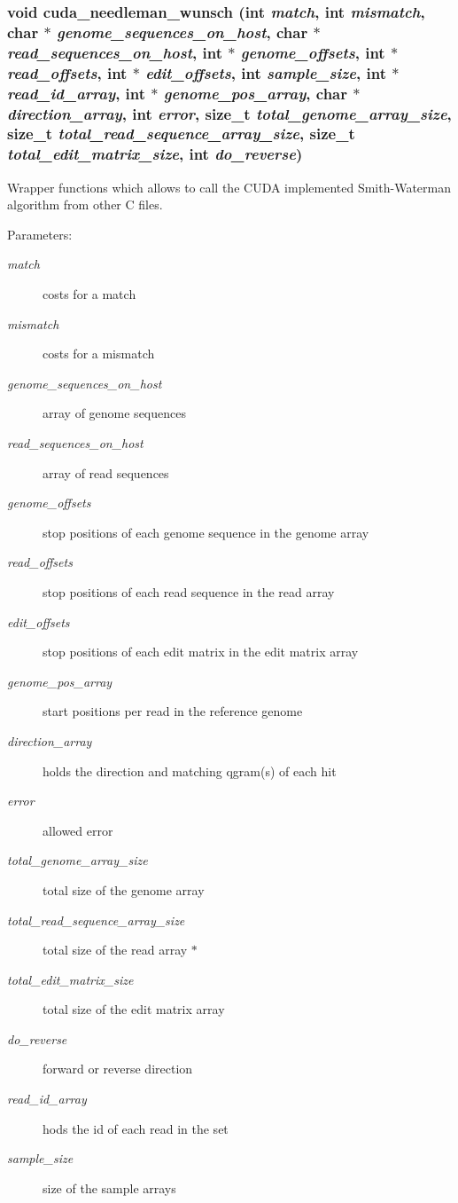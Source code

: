\subsubsection[{cuda\_\-needleman\_\-wunsch}]{\setlength{\rightskip}{0pt plus 5cm}void cuda\_\-needleman\_\-wunsch (int {\em match}, \/  int {\em mismatch}, \/  char $\ast$ {\em genome\_\-sequences\_\-on\_\-host}, \/  char $\ast$ {\em read\_\-sequences\_\-on\_\-host}, \/  int $\ast$ {\em genome\_\-offsets}, \/  int $\ast$ {\em read\_\-offsets}, \/  int $\ast$ {\em edit\_\-offsets}, \/  int {\em sample\_\-size}, \/  int $\ast$ {\em read\_\-id\_\-array}, \/  int $\ast$ {\em genome\_\-pos\_\-array}, \/  char $\ast$ {\em direction\_\-array}, \/  int {\em error}, \/  size\_\-t {\em total\_\-genome\_\-array\_\-size}, \/  size\_\-t {\em total\_\-read\_\-sequence\_\-array\_\-size}, \/  size\_\-t {\em total\_\-edit\_\-matrix\_\-size}, \/  int {\em do\_\-reverse})}\label{cuda-functions_8h_814f4e20bf4cd93e1c67e63f4eebdb32}


Wrapper functions which allows to call the CUDA implemented Smith-Waterman algorithm from other C files. \begin{Desc}
\item[Parameters:]
\begin{description}
\item[{\em match}]costs for a match \item[{\em mismatch}]costs for a mismatch \item[{\em genome\_\-sequences\_\-on\_\-host}]array of genome sequences \item[{\em read\_\-sequences\_\-on\_\-host}]array of read sequences \item[{\em genome\_\-offsets}]stop positions of each genome sequence in the genome array \item[{\em read\_\-offsets}]stop positions of each read sequence in the read array \item[{\em edit\_\-offsets}]stop positions of each edit matrix in the edit matrix array \item[{\em genome\_\-pos\_\-array}]start positions per read in the reference genome \item[{\em direction\_\-array}]holds the direction and matching qgram(s) of each hit \item[{\em error}]allowed error \item[{\em total\_\-genome\_\-array\_\-size}]total size of the genome array \item[{\em total\_\-read\_\-sequence\_\-array\_\-size}]total size of the read array $\ast$ \item[{\em total\_\-edit\_\-matrix\_\-size}]total size of the edit matrix array \item[{\em do\_\-reverse}]forward or reverse direction \item[{\em read\_\-id\_\-array}]hods the id of each read in the set \item[{\em sample\_\-size}]size of the sample arrays \end{description}
\end{Desc}


